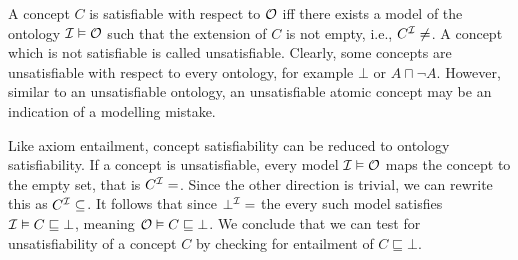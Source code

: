 A concept $C$ is satisfiable with respect to $\mathcal{O}$ iff there exists a model of the ontology $\mathcal{I} \vDash \mathcal{O}$ such that the extension of $C$ is not empty, i.e., $C^\Imc \not= \empty$. A concept which is not satisfiable is called unsatisfiable. Clearly, some concepts are unsatisfiable with respect to every ontology, for example $\bot$ or $A \sqcap \lnot A$. However, similar to an unsatisfiable ontology, an unsatisfiable atomic concept may be an indication of a modelling mistake.

Like axiom entailment, concept satisfiability can be reduced to ontology satisfiability. If a concept is unsatisfiable, every model $\mathcal{I} \vDash \mathcal{O}$ maps the concept to the empty set, that is $C^\Imc = \empty$. Since the other direction is trivial, we can rewrite this as $C^\Imc \subseteq \empty$. It follows that since $\bot^\Imc = \empty$ the every such model satisfies $\mathcal{I} \vDash C \sqsubseteq \bot$, meaning $\mathcal{O} \vDash C \sqsubseteq \bot$. We conclude that we can test for unsatisfiability of a concept $C$ by checking for entailment of $C \sqsubseteq \bot$.
